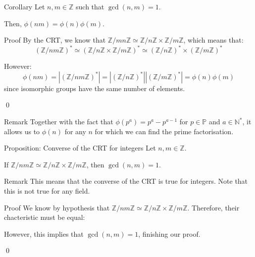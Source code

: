 \documentclass[a4paper]{article}
\begin{document}
\begin{parag}{Corollary}
    Let $n, m \in \mathbb{Z}$ such that $\gcd\left(n, m\right) = 1$.

    Then, $\phi\left(n m\right) = \phi\left(n\right)\phi\left(m\right)$.

    \begin{subparag}{Proof}
        By the CRT, we know that $\mathbb{Z}/mn\mathbb{Z} \simeq \mathbb{Z}/n\mathbb{Z} \times \mathbb{Z}/m\mathbb{Z}$, which means that: 
        \[\left(\mathbb{Z}/nm\mathbb{Z}\right)^* \simeq \left(\mathbb{Z}/n\mathbb{Z} \times \mathbb{Z}/m\mathbb{Z}\right)^* \simeq \left(\mathbb{Z}/n\mathbb{Z}\right)^* \times \left(\mathbb{Z}/m\mathbb{Z}\right)^*\]

        However: 
        \[\phi\left(nm\right) = \left|\left(\mathbb{Z}/nm\mathbb{Z}\right)^*\right| = \left|\left(\mathbb{Z}/n\mathbb{Z}\right)^*\right| \left|\left(\mathbb{Z}/m\mathbb{Z}\right)^*\right| = \phi\left(n\right)\phi\left(m\right)\]
        since isomorphic groups have the same number of elements.

        \qed
    \end{subparag}

    \begin{subparag}{Remark}
        Together with the fact that $\phi\left(p^a\right) = p^a - p^{a-1}$ for $p \in \mathbb{P}$ and $a \in \mathbb{N}^*$, it allows us to $\phi\left(n\right)$ for any $n$ for which we can find the prime factorisation.
    \end{subparag}
\end{parag}

\begin{parag}{Proposition: Converse of the CRT for integers}
    Let $n, m \in \mathbb{Z}$.

    If $\mathbb{Z}/nm\mathbb{Z} \simeq \mathbb{Z}/n\mathbb{Z} \times \mathbb{Z}/m\mathbb{Z}$, then $\gcd\left(n, m\right) = 1$.

    \begin{subparag}{Remark}
        This means that the converse of the CRT is true for integers. Note that this is not true for any field.
    \end{subparag}

    \begin{subparag}{Proof}
        We know by hypothesis that $\mathbb{Z}/nm\mathbb{Z} \simeq \mathbb{Z}/n\mathbb{Z} \times \mathbb{Z}/m\mathbb{Z}$. Therefore, their chacteristic must be equal: 
        
        However, this implies that $\gcd\left(n, m\right) = 1$, finishing our proof.

        \qed
    \end{subparag}
\end{parag}
\end{document}
